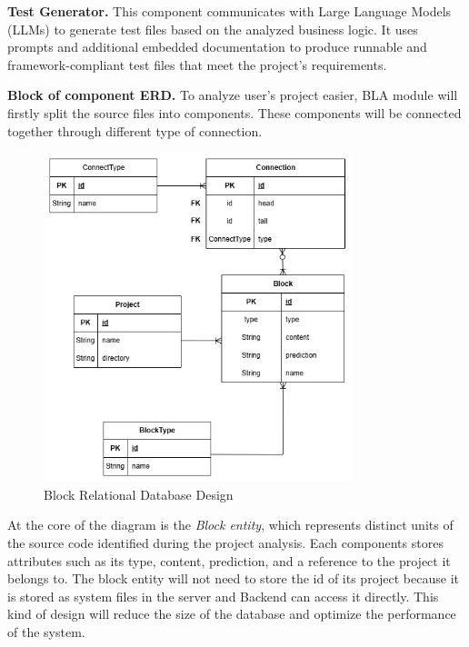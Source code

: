 \hspace{0.5cm}\textbf{Test Generator.}	This component communicates with Large Language Models (LLMs) to generate test files based on the analyzed business logic. It uses prompts and additional embedded documentation to produce runnable and framework-compliant test files that meet the project’s requirements.

\hspace{0.5cm}\textbf{Block of component ERD.}	To analyze user’s project easier, BLA module will firstly split the source files into components. These components will be connected together through different type of connection. 

\begin{figure}[H]
	\centering
	\includegraphics[width=0.8\textwidth]{images/DB block design.drawio.png}
	\caption{Block Relational Database Design}
	\label{fig:block-erd}
\end{figure}

\hspace{0.5cm}At the core of the diagram is the \textit{Block entity}, which represents distinct units of the source code identified during the project analysis. Each components stores attributes such as its type, content, prediction, and a reference to the project it belongs to. The block entity will not need to store the id of its project because it is stored as system files in the server and Backend can access it directly. This kind of design will reduce the size of the database and optimize the performance of the system.

